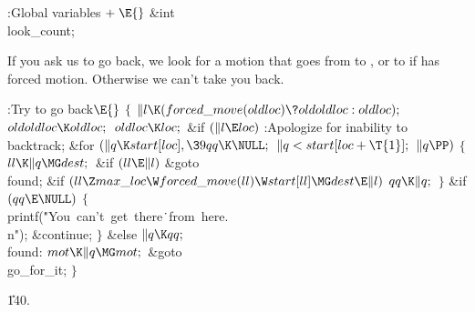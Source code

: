 \B{}:Global variables\X${}\mathrel+\E{}$\6
\&{int} \\{look\_count};\par
\fi

If you ask us to go back, we look for a motion that goes from 
to , or to  if  has forced motion.
Otherwise we can't take you back.

\Y\B\4:Try to go back\X${}\E{}$\6
${}\{{}$\1\6
${}\|l\K(\\{forced\_move}(\\{oldloc})\?\\{oldoldloc}:\\{oldloc});{}$\6
${}\\{oldoldloc}\K\\{oldloc};{}$\6
${}\\{oldloc}\K\\{loc};{}$\6
\&{if} ${}(\|l\E\\{loc}){}$\1\5
:Apologize for inability to backtrack\X;\2\6
\&{for} ${}(\|q\K\\{start}[\\{loc}],\39\\{qq}\K\NULL;{}$ ${}\|q<\\{start}[\\{loc}+\T{1}];{}$ ${}\|q\PP){}$\5
${}\{{}$\1\6
${}\\{ll}\K\|q\MG\\{dest};{}$\6
\&{if} ${}(\\{ll}\E\|l){}$\1\5
\&{goto} \\{found};\2\6
\&{if} ${}(\\{ll}\Z\\{max\_loc}\W\\{forced\_move}(\\{ll})\W\\{start}[\\{ll}]\MG\\{dest}\E\|l){}$\1\5
${}\\{qq}\K\|q;{}$\2\6
\4${}\}{}$\2\6
\&{if} ${}(\\{qq}\E\NULL){}$\5
${}\{{}$\1\6
\\{printf}(\.{"You\ can't\ get\ there}\)\.{\ from\ here.\\n"});\5
\&{continue};\6
\4${}\}{}$\2\6
\&{else}\1\5
${}\|q\K\\{qq};{}$\2\6
\4\\{found}:\5
${}\\{mot}\K\|q\MG\\{mot};{}$\6
\&{goto} \\{go\_for\_it};\6
\4${}\}{}$\2\par
\U140.\fi


